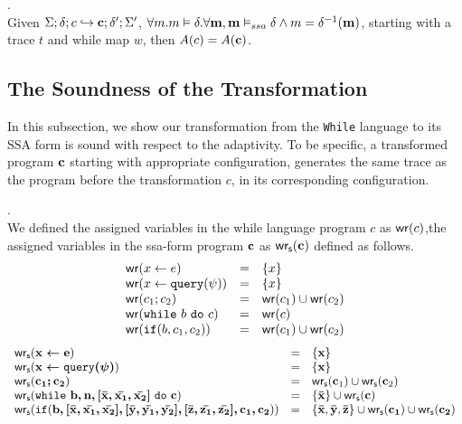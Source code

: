 \documentclass[a4paper,11pt]{article}
\begin{document}
%
\begin{coro}
.
\\
{Given $\Sigma; \delta ; c \hookrightarrow \boldsymbol{\mathbf{c}} ; \delta';\Sigma' $, 
$\forall m. m \vDash \delta. \forall \boldsymbol{\mathbf{m}}, \boldsymbol{\mathbf{m}} \vDash_{ssa} \delta \land m = \delta^{-1}(\boldsymbol{\mathbf{m}})$, starting with a trace $t$ and while map $w$, then 
$A(c) = A(\boldsymbol{\mathbf{c}}) $.
}
\end{coro}
%
%
\subsection{The Soundness of the Transformation}
In this subsection, we show our transformation from the {\tt While} language to its SSA form is sound with respect to the adaptivity. 
To be specific, a transformed program $\boldsymbol{\mathbf{c}}$ starting with appropriate configuration, generates the same trace as the program before the transformation $c$, in its corresponding configuration.
%
%
\begin{defn}.
\\
We defined the assigned variables in the while language program $c$ as $\mathsf{wr} (c)$,the assigned variables in the ssa-form program $\boldsymbol{\mathbf{c}}$ as $\mathsf{wr_s} (\boldsymbol{\mathbf{c}})$ defined as follows.
\[
\begin{array}{lll}
    \mathsf{wr} (\mathrel{ x \leftarrow e }) & =& \{ x \} \\
    \mathsf{wr} (\mathrel{ x \leftarrow {\tt query}(\psi) }) & =& \{ x \} \\
    \mathsf{wr} (c_1; c_2)  & = & \mathsf{wr} (c_1) \cup \mathsf{wr} (c_2) \\
    \mathsf{wr} (\mathtt{while} ~ b ~ \mathtt{do} ~ c) &= &  \mathsf{wr} (c) \\
    \mathsf{wr} (\mathtt{if}(b, c_1, c_2)) & =&  \mathsf{wr} (c_1) \cup \mathsf{wr} (c_2)\\
\end{array} 
\]
%
\[
\begin{array}{lll}
    \mathsf{wr_s} (\boldsymbol{\mathbf{\mathrel{ x \leftarrow e }}}) & =& \{ \boldsymbol{\mathbf{x}} \}
    \\
    \mathsf{wr_s} (\boldsymbol{\mathbf{\mathrel{ x \leftarrow {\tt query}(\boldsymbol{\mathbf{\psi}}) }}}) & =& \{ \boldsymbol{\mathbf{x}} \}
    \\
    \mathsf{wr_s} (\boldsymbol{\mathbf{c_1; c_2 }} )  & = & \mathsf{wr_s} (\boldsymbol{\mathbf{c}}_1) \cup \mathsf{wr_s} (\boldsymbol{\mathbf{c}}_2)
    \\
    \mathsf{wr_s} (\mathtt{while} ~ \boldsymbol{\mathbf{b, n, [\bar{x}, \bar{x_1}, \bar{x_2}] ~ \mathtt{do} ~ \boldsymbol{\mathbf{c}}}})
    & = &  
    \{\boldsymbol{\mathbf{\bar{x}}}\} \cup \mathsf{wr_s} (\boldsymbol{\mathbf{c}}) 
    \\
    \mathsf{wr_s} (\mathtt{if}(\boldsymbol{\mathbf{b,[\bar{x}, \bar{x_1}, \bar{x_2}],[\bar{y}, \bar{y_1}, \bar{y_2}],[\bar{z}, \bar{z_1}, \bar{z_2}], c_1, c_2}} )) 
    & =&  \{ \boldsymbol{\mathbf{\bar{x}}},\boldsymbol{\mathbf{\bar{y}}} , \boldsymbol{\mathbf{\bar{z}}} \} 
    \cup \mathsf{wr_s} (\boldsymbol{\mathbf{c_1}}) \cup \mathsf{wr_s} (\boldsymbol{\mathbf{c_2}})\\
\end{array}
\]
\end{defn}
\end{document}

